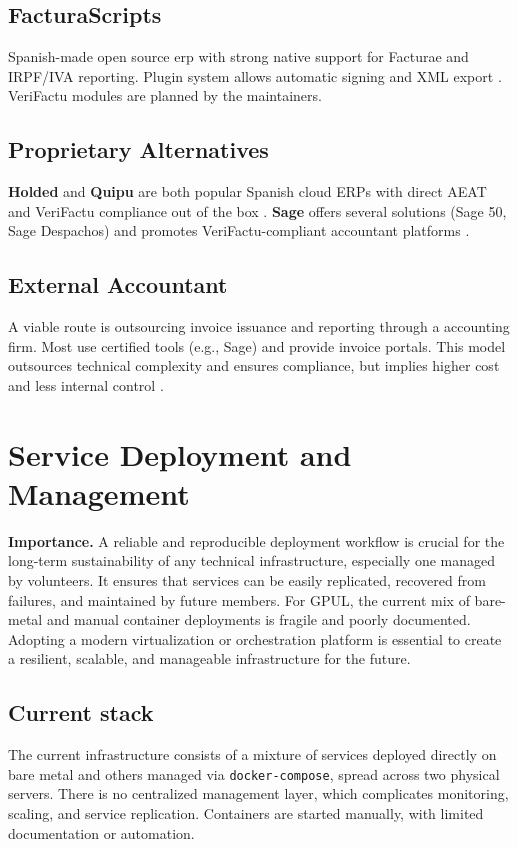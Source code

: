 \subsection*{FacturaScripts}
Spanish-made open source \gls{erp} with strong native support for Facturae and IRPF/IVA reporting. Plugin system allows automatic signing and XML export \cite{facturascripts-antifraude}. VeriFactu modules are planned by the maintainers.

\subsection*{Proprietary Alternatives}

\textbf{Holded} and \textbf{Quipu} are both popular Spanish cloud ERPs with direct AEAT and VeriFactu compliance out of the box \cite{holded-verifactu}. \textbf{Sage} offers several solutions (Sage 50, Sage Despachos) and promotes VeriFactu-compliant accountant platforms \cite{sage-verifactu}.

\subsection*{External Accountant}
A viable route is outsourcing invoice issuance and reporting through a accounting firm. Most use certified tools (e.g., Sage) and provide invoice portals. This model outsources technical complexity and ensures compliance, but implies higher cost and less internal control \cite{sage-blog-asesoria}.

\section{Service Deployment and Management}

\textbf{Importance.} A reliable and reproducible deployment workflow is crucial for the long-term sustainability of any technical infrastructure, especially one managed by volunteers. It ensures that services can be easily replicated, recovered from failures, and maintained by future members. For GPUL, the current mix of bare-metal and manual container deployments is fragile and poorly documented. Adopting a modern virtualization or orchestration platform is essential to create a resilient, scalable, and manageable infrastructure for the future.

\subsection*{Current stack}
The current infrastructure consists of a mixture of services deployed directly on bare metal and others managed via \texttt{docker-compose}, spread across two physical servers. There is no centralized management layer, which complicates monitoring, scaling, and service replication. Containers are started manually, with limited documentation or automation.

